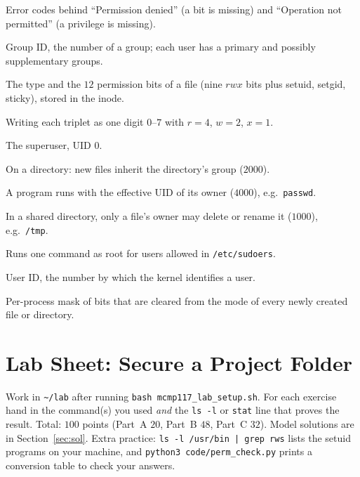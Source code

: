 \documentclass[11pt,a4paper]{article}
\newcommand{\cmd}[1]{\texttt{#1}}
\begin{document}
\begin{description}[leftmargin=0pt,itemsep=0.15em]
  \item[EACCES / EPERM] Error codes behind ``Permission denied'' (a bit is missing) and ``Operation not permitted'' (a privilege is missing).
  \item[GID] Group ID, the number of a group; each user has a primary and possibly supplementary groups.
  \item[Mode] The type and the $12$ permission bits of a file (nine $rwx$ bits plus setuid, setgid, sticky), stored in the inode.
  \item[Octal notation] Writing each triplet as one digit $0$--$7$ with $r=4$, $w=2$, $x=1$.
  \item[root] The superuser, UID $0$.
  \item[setgid] On a directory: new files inherit the directory's group ($2000$).
  \item[setuid] A program runs with the effective UID of its owner ($4000$), e.g.\ \cmd{passwd}.
  \item[Sticky bit] In a shared directory, only a file's owner may delete or rename it ($1000$), e.g.\ \texttt{/tmp}.
  \item[sudo] Runs one command as root for users allowed in \texttt{/etc/sudoers}.
  \item[UID] User ID, the number by which the kernel identifies a user.
  \item[umask] Per-process mask of bits that are cleared from the mode of every newly created file or directory.
\end{description}

\section{Lab Sheet: Secure a Project Folder}
\label{sec:lab}

Work in \texttt{\textasciitilde/lab} after running \cmd{bash mcmp117\_lab\_setup.sh}. For each exercise hand in the command(s) you used \emph{and} the \cmd{ls -l} or \cmd{stat} line that proves the result. Total: $100$ points (Part~A $20$, Part~B $48$, Part~C $32$). Model solutions are in Section~\ref{sec:sol}. Extra practice: \cmd{ls -l /usr/bin | grep rws} lists the setuid programs on your machine, and \cmd{python3 code/perm\_check.py} prints a conversion table to check your answers.
\end{document}
